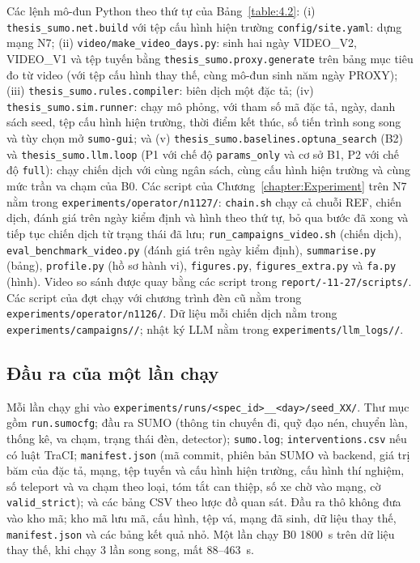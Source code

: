 \documentclass[../main.tex]{subfiles}
\begin{document}
\begin{sloppypar}

Các lệnh mô-đun Python theo thứ tự của Bảng~\ref{table:4.2}: (i) \texttt{thesis\_sumo.net.build} với tệp cấu hình hiện trường \texttt{config/\allowbreak site.yaml}: dựng mạng N7; (ii) \texttt{video/\allowbreak make\_video\_days.py}: sinh hai ngày VIDEO\_V2, VIDEO\_V1 và tệp tuyến bằng \texttt{thesis\_sumo.proxy.generate} trên bảng mục tiêu đo từ video (với tệp cấu hình thay thế, cùng mô-đun sinh năm ngày PROXY); (iii) \texttt{thesis\_sumo.rules.compiler}: biên dịch một đặc tả; (iv) \texttt{thesis\_sumo.sim.runner}: chạy mô phỏng, với tham số mã đặc tả, ngày, danh sách seed, tệp cấu hình hiện trường, thời điểm kết thúc, số tiến trình song song và tùy chọn mở \texttt{sumo-gui}; và (v) \texttt{thesis\_sumo.baselines.optuna\_search} (B2) và \texttt{thesis\_sumo.llm.loop} (P1 với chế độ \texttt{params\_only} và cơ sở B1, P2 với chế độ \texttt{full}): chạy chiến dịch với cùng ngân sách, cùng cấu hình hiện trường và cùng mức trần va chạm của B0. Các script của Chương~\ref{chapter:Experiment} trên N7 nằm trong \texttt{experiments/\allowbreak operator/\allowbreak n1127/}: \texttt{chain.sh} chạy cả chuỗi REF, chiến dịch, đánh giá trên ngày kiểm định và hình theo thứ tự, bỏ qua bước đã xong và tiếp tục chiến dịch từ trạng thái đã lưu; \texttt{run\_campaigns\_video.sh} (chiến dịch), \texttt{eval\_benchmark\_video.py} (đánh giá trên ngày kiểm định), \texttt{summarise.py} (bảng), \texttt{profile.py} (hồ sơ hành vi), \texttt{figures.py}, \texttt{figures\_extra.py} và \texttt{fa.py} (hình). Video so sánh được quay bằng các script trong \texttt{report/-11-27/\allowbreak scripts/}. Các script của đợt chạy với chương trình đèn cũ nằm trong \texttt{experiments/\allowbreak operator/\allowbreak n1126/}. Dữ liệu mỗi chiến dịch nằm trong \texttt{experiments/\allowbreak campaigns//}; nhật ký LLM nằm trong \texttt{experiments/\allowbreak llm\_logs//}.
\end{sloppypar}

\subsection{Đầu ra của một lần chạy}

Mỗi lần chạy ghi vào \texttt{experiments/\allowbreak runs/\allowbreak <spec\_id>\_\_<day>/\allowbreak seed\_XX/}. Thư mục gồm \texttt{run.sumocfg}; đầu ra SUMO (thông tin chuyến đi, quỹ đạo nén, chuyển làn, thống kê, va chạm, trạng thái đèn, detector); \texttt{sumo.log}; \texttt{interventions.csv} nếu có luật TraCI; \texttt{manifest.json} (mã commit, phiên bản SUMO và backend, giá trị băm của đặc tả, mạng, tệp tuyến và cấu hình hiện trường, cấu hình thí nghiệm, số teleport và va chạm theo loại, tóm tắt can thiệp, số xe chờ vào mạng, cờ \texttt{valid\_strict}); và các bảng CSV theo lược đồ quan sát. Đầu ra thô không đưa vào kho mã; kho mã lưu mã, cấu hình, tệp vá, mạng đã sinh, dữ liệu thay thế, \texttt{manifest.json} và các bảng kết quả nhỏ. Một lần chạy B0 1800~s trên dữ liệu thay thế, khi chạy 3 lần song song, mất 88--463~s.
\end{document}
